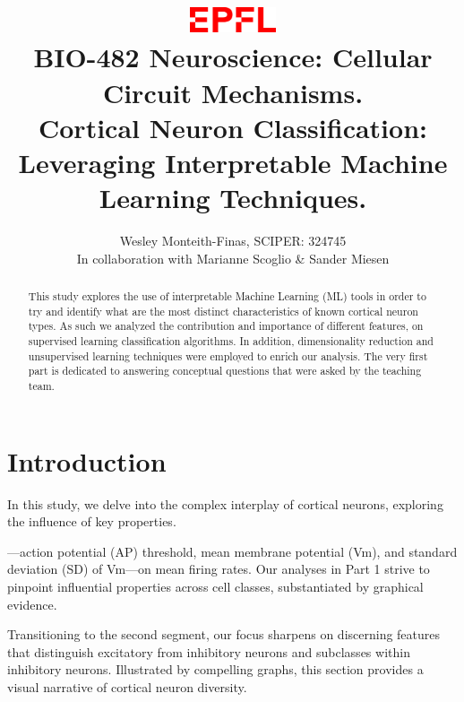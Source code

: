 \documentclass{IEEEtran}
\begin{document}
\title{
  \includegraphics[width=1in]{figures/logo.png}\\
  BIO-482 Neuroscience: Cellular Circuit Mechanisms.\\
Cortical Neuron Classification: Leveraging Interpretable Machine Learning Techniques.
}
\author{
  Wesley Monteith-Finas, SCIPER: 324745\\
In collaboration with Marianne Scoglio \& Sander Miesen
}
\maketitle


\begin{abstract}
  This study explores the use of interpretable Machine Learning (ML) tools in order to try and identify what are the most distinct characteristics of known cortical neuron types. As such we analyzed the contribution and importance of different features, on supervised learning classification algorithms. In addition, dimensionality reduction and unsupervised learning techniques were employed to enrich our analysis. The very first part is dedicated to answering conceptual questions that were asked by the teaching team.
\end{abstract}


\section{Introduction}


In this study, we delve into the complex interplay of cortical neurons, exploring the influence of key properties.


—action potential (AP) threshold, mean membrane potential (Vm), and standard deviation (SD) of Vm—on mean firing rates. Our analyses in Part 1 strive to pinpoint influential properties across cell classes, substantiated by graphical evidence.

Transitioning to the second segment, our focus sharpens on discerning features that distinguish excitatory from inhibitory neurons and subclasses within inhibitory neurons. Illustrated by compelling graphs, this section provides a visual narrative of cortical neuron diversity.
\end{document}
